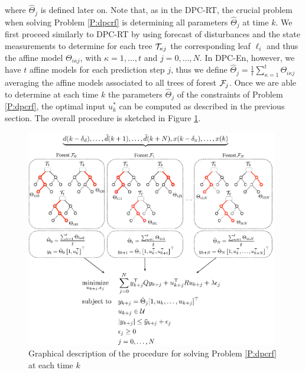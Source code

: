 \noindent \textcolor[rgb]{0,0,1}{where $\hat{\Theta}_{j}$ is defined later on. Note that, as in the DPC-RT, the crucial problem when solving Problem \ref{P:dpcrf} is determining all parameters $\hat{\Theta}_{j}$ at time $k$. We first proceed similarly to DPC-RT by using forecast of disturbances and the state measurements to determine for each tree $\mathcal{T}_{\kappa j}$ the corresponding leaf $\ell_i$ and thus the affine model $\Theta_{i \kappa j}$, with $\kappa = 1,\ldots,t$ and $j = 0,\ldots,N$. In DPC-En, however, we have $t$ affine models for each prediction step $j$, thus we define $\hat{\Theta}_{j} = \frac{1}{t}\sum\limits_{\kappa = 1}^{t} \Theta_{i \kappa j}$ averaging the affine models associated to all trees of forest $\mathcal{F}_j$. Once we are able to determine at each time $k$ the parameters $\hat{\Theta}_{j}$ of the constraints of Problem \ref{P:dpcrf}, the optimal input $u^*_k$ can be computed as described in the previous section. The overall procedure is sketched in Figure \ref{F:dpc-algo-rf}.}
\begin{figure}[t!]
	\centering
	\includegraphics[width=26pc]{figures/dpc-algo-rf.eps}
	\caption{\textcolor[rgb]{0,0,1}{Graphical description of the procedure for solving Problem \ref{P:dpcrf} at each time $k$}}
	\label{F:dpc-algo-rf}
\end{figure}

